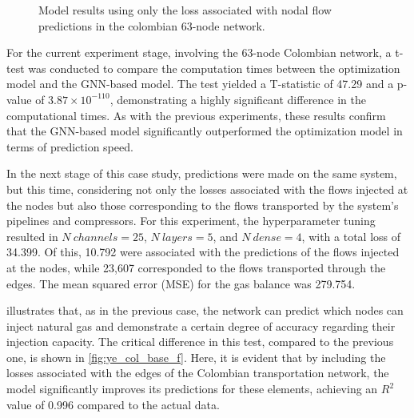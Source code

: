 \begin{figure}
    \centering
        \setlength{}        
        \setlength{} 
    \caption{Model results using only the loss associated with nodal flow predictions in the colombian 63-node network.}
    \label{fig:lineal_col_base_results}
\end{figure}


For the current experiment stage, involving the 63-node Colombian network, a t-test was conducted to compare the computation times between the optimization model and the GNN-based model. The test yielded a T-statistic of 47.29 and a p-value of $3.87 \times 10^{-110}$, demonstrating a highly significant difference in the computational times. As with the previous experiments, these results confirm that the GNN-based model significantly outperformed the optimization model in terms of prediction speed.








In the next stage of this case study, predictions were made on the same system, but this time, considering not only the losses associated with the flows injected at the nodes but also those corresponding to the flows transported by the system's pipelines and compressors. For this experiment, the hyperparameter tuning resulted in $N \ channels = 25$, $N \ layers = 5$, and $N \ dense = 4$, with a total loss of 34.399. Of this, 10.792 were associated with the predictions of the flows injected at the nodes, while 23,607 corresponded to the flows transported through the edges. The mean squared error (MSE) for the gas balance was 279.754.

 illustrates that, as in the previous case, the network can predict which nodes can inject natural gas and demonstrate a certain degree of accuracy regarding their injection capacity. The critical difference in this test, compared to the previous one, is shown in \cref{fig:ye_col_base_f}. Here, it is evident that by including the losses associated with the edges of the Colombian transportation network, the model significantly improves its predictions for these elements, achieving an $R^2$ value of 0.996 compared to the actual data.


